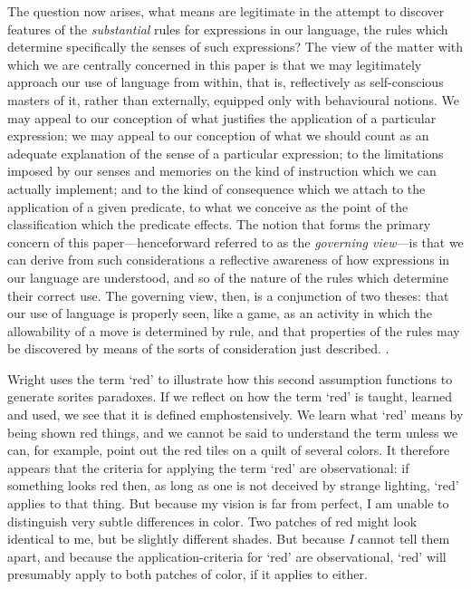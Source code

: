 \documentclass[11pt]{article}
\newenvironment{squote}{%
\begin{spacing}{1}
       	\begin{list}{}{%
\setlength{\labelwidth}{0pt}%
\rightmargin\leftmargin%
}
\item\relax
}{%
\end{list}%
\end{spacing}
}
\begin{document}
\begin{spacing}{1.5}
\begin{squote}
The question now arises, what means are legitimate in the attempt to
discover features of the \emph{substantial} rules for expressions in
our language, the rules which determine specifically the senses of
such expressions?  The view of the matter with which we are centrally
concerned in this paper is that we may legitimately approach our use
of language from within, that is, reflectively as self-conscious
masters of it, rather than externally, equipped only with behavioural
notions.  We may appeal to our conception of what justifies the
application of a particular expression; we may appeal to our
conception of what we should count as an adequate explanation of the
sense of a particular expression; to the limitations imposed by our
senses and memories on the kind of instruction which we can actually
implement; and to the kind of consequence which we attach to the
application of a given predicate, to what we conceive as the point of
the classification which the predicate effects.  The notion that forms
the primary concern of this paper---henceforward referred to as the
\emph{governing view}---is that we can derive from such considerations
a reflective awareness of how expressions in our language are
understood, and so of the nature of the rules which determine their
correct use.  The governing view, then, is a conjunction of two
theses: that our use of language is properly seen, like a game, as an
activity in which the allowability of a move is determined by rule,
and that properties of the rules may be discovered by means of the
sorts of consideration just described. \citep[327]{wright1975}.
\end{squote}

Wright uses the term `red' to illustrate how this second assumption
functions to generate sorites paradoxes.  If we reflect on how the
term `red' is taught, learned and used, we see that it is defined
emph{ostensively}.  We learn what `red' means by being shown red
things, and we cannot be said to understand the term unless we can,
for example, point out the red tiles on a quilt of several colors.  It
therefore appears that the criteria for applying the term `red' are
observational: if something looks red then, as long as one is not
deceived by strange lighting, `red' applies to that thing.  But
because my vision is far from perfect, I am unable to distinguish very
subtle differences in color.  Two patches of red might look identical
to me, but be slightly different shades.  But because \emph{I} cannot
tell them apart, and because the application-criteria for `red' are
observational, `red' will presumably apply to both patches of color,
if it applies to either.


\end{spacing}
\end{document}
